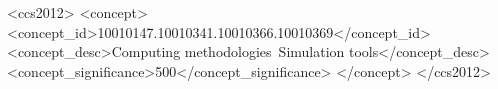 
\begin{CCSXML}
	<ccs2012>
	<concept>
	<concept_id>10010147.10010341.10010366.10010369</concept_id>
	<concept_desc>Computing methodologies~Simulation tools</concept_desc>
	<concept_significance>500</concept_significance>
	</concept>
	</ccs2012>
\end{CCSXML}


